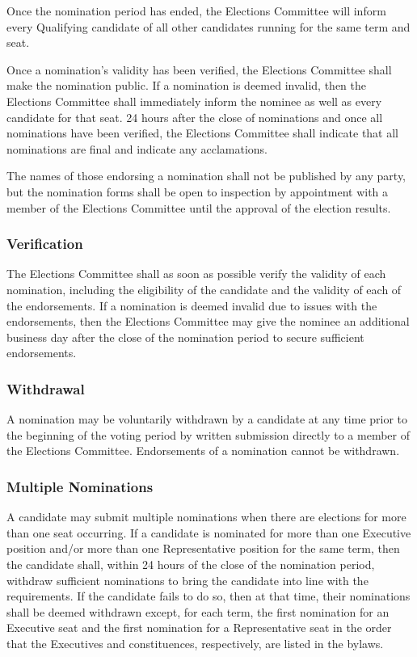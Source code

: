 Once the nomination period has ended, the Elections Committee will inform every Qualifying 
candidate of all other candidates running for the same term and seat.

Once a nomination's validity has been verified, the Elections Committee shall
make the nomination public. If a nomination is deemed invalid, then the
Elections Committee shall immediately inform the nominee as well as every
candidate for that seat. 24 hours after the close of nominations and once all
nominations have been verified, the Elections Committee shall indicate that all
nominations are final and indicate any acclamations.

The names of those endorsing a nomination shall not be published by any party,
but the nomination forms shall be open to inspection by appointment with a
member of the Elections Committee until the approval of the election results.

\subsubsection{Verification}
The Elections Committee shall as soon as possible verify the validity of each
nomination, including the eligibility of the candidate and the validity of each
of the endorsements. If a nomination is deemed invalid due to issues with the
endorsements, then the Elections Committee may give the nominee an additional
business day after the close of the nomination period to secure sufficient
endorsements.

\subsubsection{Withdrawal}
A nomination may be voluntarily withdrawn by a candidate at any time prior to
the beginning of the voting period by written submission directly to a member of
the Elections Committee. Endorsements of a nomination cannot be withdrawn.

\subsubsection{Multiple Nominations}
A candidate may submit multiple nominations when there are elections for more than
one seat occurring. If a candidate is nominated for more than one Executive
position and/or more than one Representative position for the same term, then
the candidate shall, within 24 hours of the close of the nomination period,
withdraw sufficient nominations to bring the candidate into line with the
requirements. If the candidate fails to do so, then at that time, their
nominations shall be deemed withdrawn except, for each term, the first
nomination for an Executive seat and the first nomination for a Representative
seat in the order that the Executives and constituences, respectively, are
listed in the bylaws.

